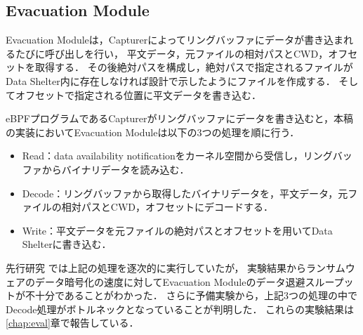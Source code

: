 \subsection{Evacuation Module}
Evacuation Moduleは，Capturerによってリングバッファにデータが書き込まれるたびに呼び出しを行い，
平文データ，元ファイルの相対パスとCWD，オフセットを取得する．
その後絶対パスを構成し，絶対パスで指定されるファイルがData Shelter内に存在しなければ設計で示したようにファイルを作成する．
そしてオフセットで指定される位置に平文データを書き込む．

eBPFプログラムであるCapturerがリングバッファにデータを書き込むと，本稿の実装においてEvacuation Moduleは以下の3つの処理を順に行う．
\begin{itemize}
  \item Read：data availability notificationをカーネル空間から受信し，リングバッファからバイナリデータを読み込む．
  \item Decode：リングバッファから取得したバイナリデータを，平文データ，元ファイルの相対パスとCWD，オフセットにデコードする．
  \item Write：平文データを元ファイルの絶対パスとオフセットを用いてData Shelterに書き込む．
\end{itemize}
先行研究 \cite{css2024} では上記の処理を逐次的に実行していたが，
実験結果からランサムウェアのデータ暗号化の速度に対してEvacuation Moduleのデータ退避スループットが不十分であることがわかった．
さらに予備実験から，上記3つの処理の中でDecode処理がボトルネックとなっていることが判明した．
これらの実験結果は\ref{chap:eval}章で報告している．

